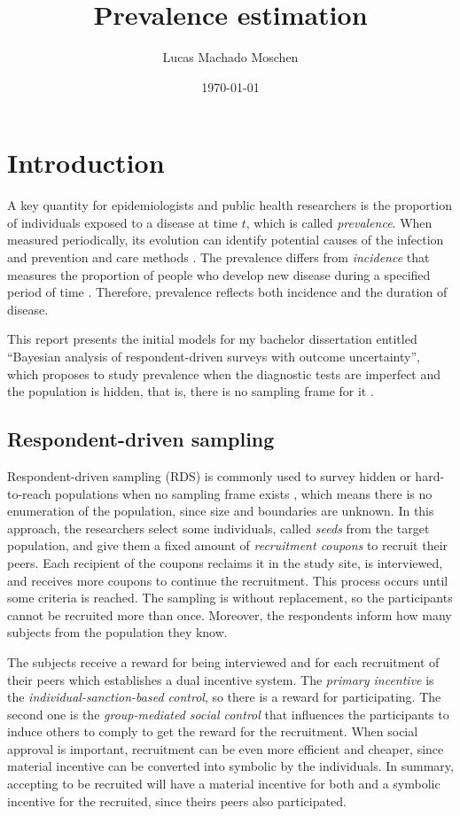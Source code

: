 \documentclass[a4paper, notitlepage, 11pt]{article}
\title{Prevalence estimation}
\author{Lucas Machado Moschen}
\affil{School of Applied Mathematics, \\ Fundação Getulio Vargas}
\date{\today}
\theoremstyle{definition}
\theoremstyle{remark}
\begin{document}
\maketitle

\section{Introduction}

A key quantity for epidemiologists and public health researchers is the
proportion of individuals exposed to a disease at time $t$, which is called
{\em prevalence}. When measured
periodically, its evolution can identify potential causes of the infection
and prevention and care methods \cite[]{noordzij2010measures}. The prevalence
differs from {\em incidence } that measures the proportion of people who
develop new disease during a specified period of time
\cite[]{rothman2008modern}. Therefore, prevalence reflects both incidence and the
duration of disease. 

This report presents the initial models for my bachelor dissertation entitled ``Bayesian analysis of respondent-driven surveys with
outcome uncertainty'', which proposes to study prevalence when the diagnostic
tests are imperfect and the population is hidden, that is, there is no
sampling frame for it \cite[]{heckathorn1997}. 

\subsection{Respondent-driven sampling}

Respondent-driven sampling (RDS) is commonly used to survey hidden or hard-to-reach populations when
no sampling frame exists \cite[]{heckathorn1997}, which means there is no
enumeration of the population, since size and boundaries are unknown. In this approach, the
researchers select some individuals, called {\em seeds} from the target
population, and give them a fixed amount of {\em recruitment coupons} to
recruit their peers. Each recipient of the coupons reclaims it in the study
site, is interviewed, and receives more coupons to continue the recruitment.
This process occurs until some criteria is reached. The sampling is without
replacement, so the participants cannot be recruited more than once. Moreover,
the respondents inform how many subjects from the population they know.

The subjects receive a reward for being interviewed and for each recruitment
of their peers which establishes a dual incentive system. The {\em primary incentive} is the
{\em individual-sanction-based control}, so there is a reward for
participating. The second one is the {\em group-mediated social control} that
influences the participants to induce others to comply to get the reward for the recruitment. When social approval is important, recruitment can be even
more efficient and cheaper, since material incentive can be converted into
symbolic by the individuals. In summary, accepting to be recruited will have a
material incentive for both and a symbolic incentive for the recruited, since
theirs peers also participated.
\end{document}
